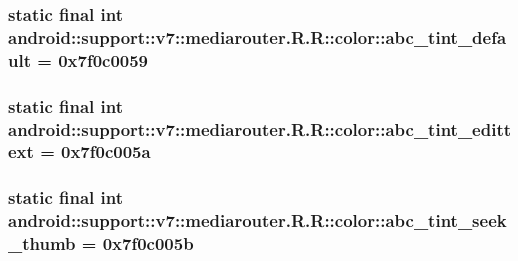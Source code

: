 \hypertarget{classandroid_1_1support_1_1v7_1_1mediarouter_1_1_r_1_1color_5d06025568c23835cdb45fd92a88f831}{
\subsubsection[{abc\_\-tint\_\-default}]{\setlength{\rightskip}{0pt plus 5cm}static final int android::support::v7::mediarouter.R.R::color::abc\_\-tint\_\-default = 0x7f0c0059}}
\label{classandroid_1_1support_1_1v7_1_1mediarouter_1_1_r_1_1color_5d06025568c23835cdb45fd92a88f831}


\hypertarget{classandroid_1_1support_1_1v7_1_1mediarouter_1_1_r_1_1color_c8dcf17e71ec823863fb987479aeeba3}{
\subsubsection[{abc\_\-tint\_\-edittext}]{\setlength{\rightskip}{0pt plus 5cm}static final int android::support::v7::mediarouter.R.R::color::abc\_\-tint\_\-edittext = 0x7f0c005a}}
\label{classandroid_1_1support_1_1v7_1_1mediarouter_1_1_r_1_1color_c8dcf17e71ec823863fb987479aeeba3}


\hypertarget{classandroid_1_1support_1_1v7_1_1mediarouter_1_1_r_1_1color_fd765537faaa17e5a8f3604ff250bec0}{
\subsubsection[{abc\_\-tint\_\-seek\_\-thumb}]{\setlength{\rightskip}{0pt plus 5cm}static final int android::support::v7::mediarouter.R.R::color::abc\_\-tint\_\-seek\_\-thumb = 0x7f0c005b}}
\label{classandroid_1_1support_1_1v7_1_1mediarouter_1_1_r_1_1color_fd765537faaa17e5a8f3604ff250bec0}


